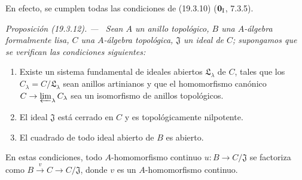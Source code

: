 \documentclass[10pt,oneside]{book}
\makeatletter
\newcommand{\setmanualcurrentlabel}[1]{\def\@currentlabel{#1}}
\newenvironment{proposition}[1][]{%
  \setmanualcurrentlabel{#1}\par\medskip\noindent\itshape Proposición (#1). ---\ }{\par}
\makeatother
\begin{document}
En efecto, se cumplen todas las condiciones de (19.3.10)
($\mathbf 0_{\rm I}$, 7.3.5).

\begin{proposition}[19.3.12]
\label{0.19.3.12-es}
Sean $A$ un anillo topológico, $B$ una $A$-álgebra formalmente lisa,
$C$ una $A$-álgebra topológica, $\mathfrak J$ un ideal de $C$; supongamos que se verifican las
condiciones siguientes:
\begin{enumerate}
  \item[$1^\circ$] Existe un sistema fundamental de ideales abiertos
  $\mathfrak L_\lambda$ de $C$, tales que los
  $C_\lambda=C/\mathfrak L_\lambda$ sean anillos artinianos y que
  el homomorfismo canónico $C\to\varprojlim_\lambda C_\lambda$ sea un
  isomorfismo de anillos topológicos.
  \item[$2^\circ$] El ideal $\mathfrak J$ está cerrado en $C$ y es
  topológicamente nilpotente.
  \item[$3^\circ$] El cuadrado de todo ideal abierto de $B$ es abierto.
\end{enumerate}
En estas condiciones, todo $A$-homomorfismo continuo
$u:B\to C/\mathfrak J$ se factoriza como
$B\xrightarrow{v}C\to C/\mathfrak J$, donde $v$ es un $A$-homomorfismo
continuo.
\end{proposition}
\end{document}
